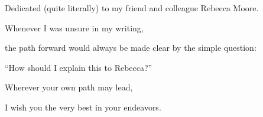 Dedicated (quite literally) to my friend and colleague Rebecca Moore.

Whenever I was unsure in my writing,

the path forward would always be made clear by the simple question:

``How should I explain this to Rebecca?''

Wherever your own path may lead,

I wish you the very best in your endeavors.

